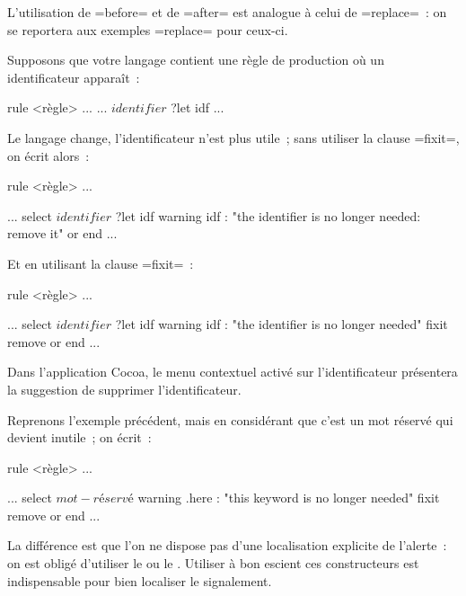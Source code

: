 L'utilisation de \ggst=before= et de \ggst=after= est analogue à celui de \ggst=replace=~: on se reportera aux exemples \ggst=replace= pour ceux-ci.



Supposons que votre langage contient une règle de production où un identificateur apparaît~:

\begin{galgas3}
rule <règle> ... {
  ...
  $identifier$ ?let idf
  ...
}
\end{galgas3}

Le langage change, l'identificateur n'est plus utile~; sans utiliser la clause \ggst=fixit=, on écrit alors~:

\begin{galgas3}
rule <règle> ... {
  ...
  select
    $identifier$ ?let idf
    warning idf : "the identifier is no longer needed: remove it"
  or
  end
  ...

}
\end{galgas3}


Et en utilisant la clause \ggst=fixit=~:

\begin{galgas3}
rule <règle> ... {
  ...
  select
    $identifier$ ?let idf
    warning idf : "the identifier is no longer needed" fixit { remove }
  or
  end
  ...

}
\end{galgas3}

Dans l'application Cocoa, le menu contextuel activé sur l'identificateur présentera la suggestion de supprimer l'identificateur.



Reprenons l'exemple précédent, mais en considérant que c'est un mot réservé qui devient inutile~; on écrit~:

\begin{galgas3}
rule <règle> ... {
  ...
  select
    $mot-réservé$
    warning .here : "this keyword is no longer needed" fixit { remove }
  or
  end
  ...

}
\end{galgas3}

La différence est que l'on ne dispose pas d'une localisation explicite de l'alerte~: on est obligé d'utiliser le  ou le . Utiliser à bon escient ces constructeurs est indispensable pour bien localiser le signalement.

